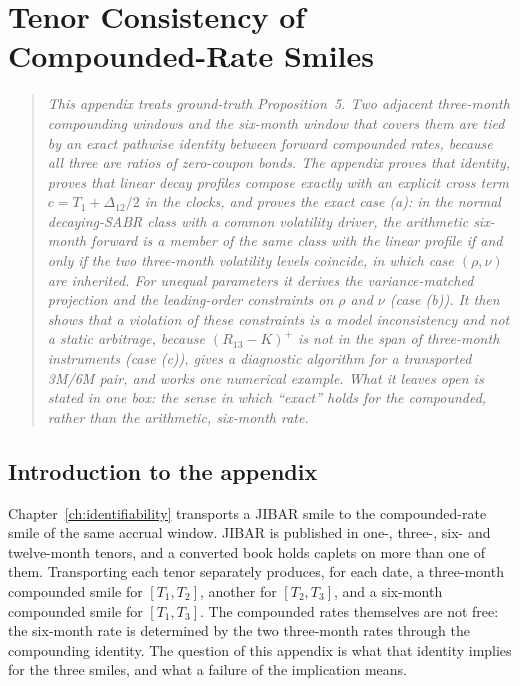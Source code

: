 \documentclass[../../main.tex]{subfiles}
\begin{document}
\chapter{Tenor Consistency of Compounded-Rate Smiles}\label{appA-tenor}\label{app:tenor}

\begin{quote}\itshape
This appendix treats ground-truth Proposition~5. Two adjacent three-month compounding windows and the six-month window that covers them are tied by an exact pathwise identity between forward compounded rates, because all three are ratios of zero-coupon bonds. The appendix proves that identity, proves that linear decay profiles compose exactly with an explicit cross term $c=T_1+\Delta_{12}/2$ in the clocks, and proves the exact case (a): in the normal decaying-SABR class with a common volatility driver, the arithmetic six-month forward is a member of the same class with the linear profile if and only if the two three-month volatility levels coincide, in which case $(\rho,\nu)$ are inherited. For unequal parameters it derives the variance-matched projection and the leading-order constraints on $\rho$ and $\nu$ (case (b)). It then shows that a violation of these constraints is a model inconsistency and not a static arbitrage, because $(R_{13}-K)^+$ is not in the span of three-month instruments (case (c)), gives a diagnostic algorithm for a transported 3M/6M pair, and works one numerical example. What it leaves open is stated in one box: the sense in which ``exact'' holds for the compounded, rather than the arithmetic, six-month rate.
\end{quote}

\section{Introduction to the appendix}\label{sec:appA-intro}

Chapter~\ref{ch:identifiability} transports a JIBAR smile to the compounded-rate smile of the same accrual window. JIBAR is published in one-, three-, six- and twelve-month tenors, and a converted book holds caplets on more than one of them. Transporting each tenor separately produces, for each date, a three-month compounded smile for $[T_1,T_2]$, another for $[T_2,T_3]$, and a six-month compounded smile for $[T_1,T_3]$. The compounded rates themselves are not free: the six-month rate is determined by the two three-month rates through the compounding identity. The question of this appendix is what that identity implies for the three smiles, and what a failure of the implication means.
\end{document}
